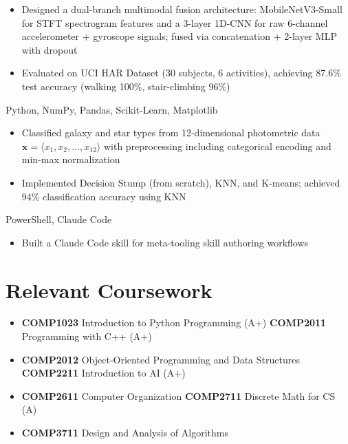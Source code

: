 \documentclass{common/resume}
\begin{document}
\begin{itemize}
  \item Designed a dual-branch multimodal fusion architecture: MobileNetV3-Small for STFT spectrogram features and a 3-layer 1D-CNN for raw 6-channel accelerometer + gyroscope signals; fused via concatenation + 2-layer MLP with dropout
  \item Evaluated on UCI HAR Dataset (30 subjects, 6 activities), achieving 87.6\% test accuracy (walking 100\%, stair-climbing 96\%)
\end{itemize}

  {Python, NumPy, Pandas, Scikit-Learn, Matplotlib}

\begin{itemize}
  \item Classified galaxy and star types from 12-dimensional photometric data $\mathbf{x} = \langle x_1, x_2, \ldots, x_{12} \rangle$ with preprocessing including categorical encoding and min-max normalization
  \item Implemented Decision Stump (from scratch), KNN, and K-means; achieved 94\% classification accuracy using KNN
\end{itemize}

  {PowerShell, Claude Code}

\begin{itemize}
  \item Built a Claude Code skill for meta-tooling skill authoring workflows
\end{itemize}

\section{Relevant Coursework}

\begin{itemize}
  \item \textbf{COMP1023} Introduction to Python Programming (A+) \hfill \textbf{COMP2011} Programming with C++ (A+)
  \item \textbf{COMP2012} Object-Oriented Programming and Data Structures \hfill \textbf{COMP2211} Introduction to AI (A+)
  \item \textbf{COMP2611} Computer Organization \hfill \textbf{COMP2711} Discrete Math for CS (A)
  \item \textbf{COMP3711} Design and Analysis of Algorithms
\end{itemize}
\end{document}
